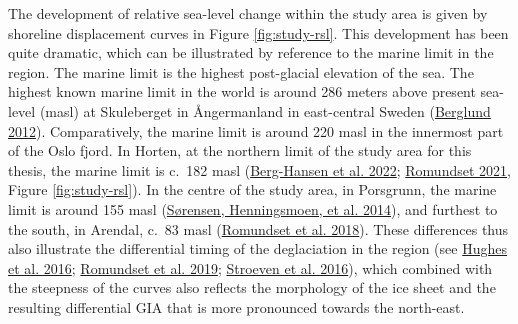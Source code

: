 \documentclass[
  12pt,
  a4paper,
  oneside]{book}
\begin{document}
The development of relative sea-level change within the study area is given by shoreline displacement curves in Figure \ref{fig:study-rsl}. This development has been quite dramatic, which can be illustrated by reference to the marine limit in the region. The marine limit is the highest post-glacial elevation of the sea. The highest known marine limit in the world is around 286 meters above present sea-level (masl) at Skuleberget in Ångermanland in east-central Sweden (\protect\hyperlink{ref-berglund2012}{Berglund 2012}). Comparatively, the marine limit is around 220 masl in the innermost part of the Oslo fjord. In Horten, at the northern limit of the study area for this thesis, the marine limit is c.~182 masl (\protect\hyperlink{ref-berg-hansen2022}{Berg-Hansen et al. 2022}; \protect\hyperlink{ref-romundset2021}{Romundset 2021}, Figure \ref{fig:study-rsl}). In the centre of the study area, in Porsgrunn, the marine limit is around 155 masl (\protect\hyperlink{ref-suxf8rensen2014}{Sørensen, Henningsmoen, et al. 2014}), and furthest to the south, in Arendal, c.~83 masl (\protect\hyperlink{ref-romundset2018}{Romundset et al. 2018}). These differences thus also illustrate the differential timing of the deglaciation in the region (see \protect\hyperlink{ref-hughes2016}{Hughes et al. 2016}; \protect\hyperlink{ref-romundset2019}{Romundset et al. 2019}; \protect\hyperlink{ref-stroeven2016}{Stroeven et al. 2016}), which combined with the steepness of the curves also reflects the morphology of the ice sheet and the resulting differential GIA that is more pronounced towards the north-east.
\end{document}
